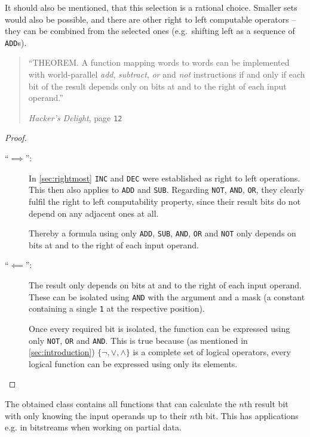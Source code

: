 It should also be mentioned, that this selection is a rational choice.
Smaller sets would also be possible,
and there are other right to left computable operators
-- they can be combined from the selected ones
(e.g.~shifting left as a sequence of \lstinline$ADD$s).

\begin{quote}
``THEOREM. A function mapping words to words can be implemented
with world-parallel \emph{add}, \emph{subtract}, \emph{or} and \emph{not}
instructions if and only if each bit of the result
depends only on bits at and to the right of each input operand.''
\par\hfill \emph{Hacker's Delight},
page \texttt{12} \cite{Warren:2012:HD:2462741}
\end{quote}

\begin{proof}~
\begin{description}
\item[``$\implies$'':]
In \autoref{sec:rightmost} \lstinline$INC$ and \lstinline$DEC$
were established as right to left operations.
This then also applies to \lstinline$ADD$ and \lstinline$SUB$.
Regarding \lstinline$NOT$, \lstinline$AND$, \lstinline$OR$,
they clearly fulfil the right to left computability property,
since their result bits do not depend on any adjacent ones at all.

Thereby a formula using only
\lstinline$ADD$, \lstinline$SUB$, \lstinline$AND$,
\lstinline$OR$ and \lstinline$NOT$
only depends on bits at and to the right of each input operand.

\item[``$\impliedby$'':]
The result only depends on bits at and to the right of each input operand.
These can be isolated using \lstinline$AND$ with the argument and a mask
(a constant containing a single \lstinline$1$ at the respective position).

Once every required bit is isolated, the function can be expressed
using only \lstinline$NOT$, \lstinline$OR$ and \lstinline$AND$.
This is true because (as mentioned in \autoref{sec:introduction})
$\{\lnot, \lor, \land\}$ is a complete set of logical operators,
every logical function can be expressed using only its elements.
\end{description}
\end{proof}

The obtained class contains all functions
that can calculate the $n$th result bit
with only knowing the input operands up to their $n$th bit.
This has applications e.g. in bitstreams when working on partial data.
